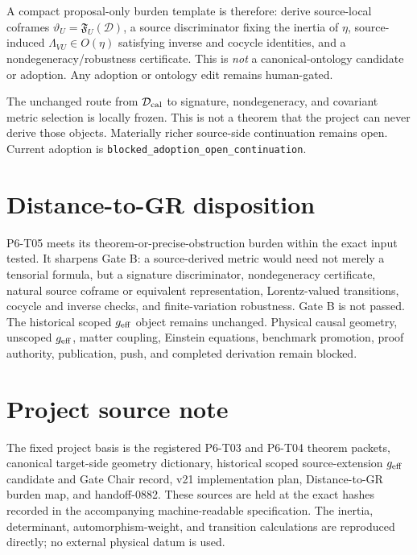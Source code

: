 \documentclass[11pt]{article}
\begin{document}
A compact proposal-only burden template is therefore:
derive source-local coframes \(\vartheta_U=\mathfrak F_U(\mathcal D)\), a
source discriminator fixing the inertia of \(\eta\), source-induced
\(\Lambda_{VU}\in O(\eta)\) satisfying inverse and cocycle identities, and a
nondegeneracy/robustness certificate. This is \emph{not} a
canonical-ontology candidate or adoption. Any adoption or ontology edit
remains human-gated.

The unchanged route from \(\mathcal D_{\rm cal}\) to signature,
nondegeneracy, and covariant metric selection is locally frozen.
This is not a theorem that the project can never derive those objects. Materially richer
source-side continuation remains open. Current adoption is
\texttt{blocked\_adoption\_open\_continuation}.

\section{Distance-to-GR disposition}

P6-T05 meets its theorem-or-precise-obstruction burden within the exact input
tested. It sharpens Gate B: a source-derived metric would need not merely a
tensorial formula, but a signature discriminator, nondegeneracy certificate,
natural source coframe or equivalent representation, Lorentz-valued
transitions, cocycle and inverse checks, and finite-variation robustness.
Gate B is not passed. The historical scoped \(g_{\rm eff}\) object remains
unchanged. Physical causal geometry, unscoped \(g_{\rm eff}\), matter
coupling, Einstein equations, benchmark promotion, proof authority,
publication, push, and completed derivation remain blocked.

\section{Project source note}

The fixed project basis is the registered P6-T03 and P6-T04 theorem packets,
canonical target-side geometry dictionary, historical scoped source-extension
\(g_{\rm eff}\) candidate and Gate Chair record, v21 implementation plan,
Distance-to-GR burden map, and handoff-0882. These sources are held at the
exact hashes recorded in the accompanying machine-readable specification.
The inertia, determinant, automorphism-weight, and transition calculations are
reproduced directly; no external physical datum is used.
\end{document}
